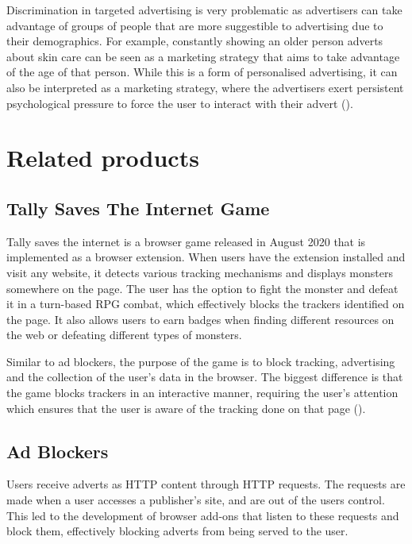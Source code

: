 \documentclass{l4proj}
\begin{document}
Discrimination in targeted advertising is very problematic as advertisers can take advantage of groups of people that are more suggestible to advertising due to their demographics. For example, constantly showing an older person adverts about skin care can be seen as a marketing strategy that aims to take advantage of the age of that person. While this is a form of personalised advertising, it can also be interpreted as a marketing strategy, where the advertisers exert persistent psychological pressure to force the user to interact with their advert (\cite{fennis2015psychology}).


\section{Related products}
\label{related}
\subsection{Tally Saves The Internet Game}
Tally saves the internet is a browser game released in August 2020 that is implemented as a browser extension. When users have the extension installed and visit any website, it detects various tracking mechanisms and displays monsters somewhere on the page. The user has the option to fight the monster and defeat it in a turn-based RPG combat, which effectively blocks the trackers identified on the page. It also allows users to earn badges when finding different resources on the web or defeating different types of monsters.

Similar to ad blockers, the purpose of the game is to block tracking, advertising and the collection of the user's data in the browser. The biggest difference is that the game blocks trackers in an interactive manner, requiring the user's attention which ensures that the user is aware of the tracking done on that page (\cite{tally}). 

\subsection{Ad Blockers}
Users receive adverts as HTTP content through HTTP requests. The requests are made when a user accesses a publisher's site, and are out of the users control. This led to the development of browser add-ons that listen to these requests and block them, effectively blocking adverts from being served to the user. 
\end{document}
